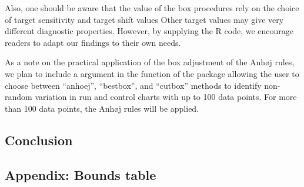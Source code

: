 Also, one should be aware that the value of the box procedures rely on
the choice of target sensitivity and target shift values Other target
values may give very different diagnostic properties. However, by
supplying the R code, we encourage readers to adapt our findings to
their own needs.

As a note on the practical application of the box adjustment of the
Anhøj rules, we plan to include a  argument in the
 function of the  package allowing the
user to choose between ``anhoej'', ``bestbox'', and ``cutbox'' methods
to identify non-random variation in run and control charts with up to
100 data points. For more than 100 data points, the Anhøj rules will be
applied.

\hypertarget{conclusion}{%
\subsection{Conclusion}\label{conclusion}}



\hypertarget{appendix-bounds-table}{%
\subsection{Appendix: Bounds table}\label{appendix-bounds-table}}

